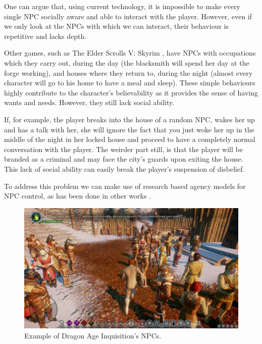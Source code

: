 One can argue that, using current technology, it is impossible to make every single \ac{NPC} socially aware and able to interact with the player.
However, even if we only look at the \acp{NPC} with which we can interact, their behaviour is repetitive and lacks depth.

Other games, such as The Elder Scrolls V: Skyrim \cite{games:skyrim}, have \acp{NPC} with occupations which they carry out, during the day (the blacksmith will spend her day at the forge working), and houses where they return to, during the night (almost every character will go to his home to have a meal and sleep).
These simple behaviours highly contribute to the character's believability as it provides the sense of having wants and needs. However, they still lack social ability.

If, for example, the player breaks into the house of a random \ac{NPC}, wakes her up and has a talk with her, she will ignore the fact that you just woke her up in the middle of the night in her locked house and proceed to have a completely normal conversation with the player.
The weirder part still, is that the player will be branded as a criminal and may face the city's guards upon exiting the house.
This lack of social ability can easily break the player's suspension of disbelief.

To address this problem we can make use of research based agency models for \ac{NPC} control, as has been done in other works \cite{guimaraes:cif-ck-17}\cite{ferreira:merchant-model}.

\begin{figure}
  \centering
  \includegraphics[width=\textwidth]{./Images/DragonAgeInquisition}
  \caption{Example of Dragon Age Inquisition's NPCs.}
  \label{fig:dragonage}
\end{figure}

